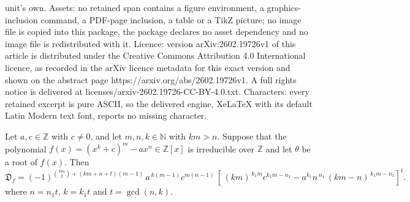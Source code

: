\documentclass[10pt,a4paper]{amsart}
\newcommand{\D}{\mathfrak{D}}
\begin{document}
unit's own. Assets: no retained span contains a figure environment, a graphics-inclusion command, a PDF-page inclusion, a table or a TikZ picture; no image file is copied into this package, the package declares no asset dependency and no image file is redistributed with it. Licence: version arXiv:2602.19726v1 of this article is distributed under the Creative Commons Attribution 4.0 International licence, as recorded in the arXiv licence metadata for this exact version and shown on the abstract page https://arxiv.org/abs/2602.19726v1. A full rights notice is delivered at licenses/arxiv-2602.19726-CC-BY-4.0.txt. Characters: every retained excerpt is pure ASCII, so the delivered engine, XeLaTeX with its default Latin Modern text font, reports no missing character.
\begin{theorem} \label{disc of f(x)}
Let $a,c \in \mathbb{Z}$ with $c \neq 0$, and let $m,n,k \in \mathbb{N}$ with $km>n$. 
Suppose that the polynomial $f(x) = (x^k + c)^m - a x^n \in \mathbb{Z}[x]$ is irreducible over $\mathbb{Z}$ and let $\theta$ be a root of $f(x)$. Then %
\begin{equation}
    \D_f
=(-1)^{\binom{km}{2}+(km+n+t)(m-1)}\,a^{\,k(m-1)}c^{m(n-1)}\,
\left[\,(km)^{\,k_1m}c^{k_1m-n_1} - a^{k_1}n^{\,n_1}\,(km-n)^{\,k_1m-n_1}\right]^{t}.
\end{equation}
where $n = n_1 t$, $k = k_1 t$ and $t=\gcd(n,k)$.
\end{theorem}
\end{document}
